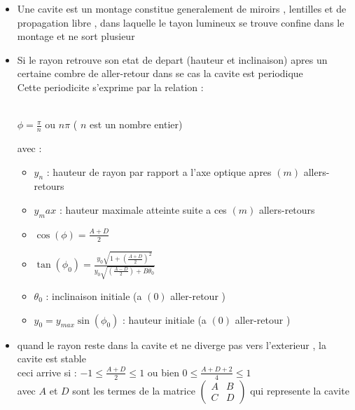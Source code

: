 \documentclass[12pt]{book}
\begin{document}
        \begin{itemize}
            \item Une cavite est un montage constitue generalement de miroirs , lentilles et de propagation libre , dans laquelle le tayon lumineux se trouve confine dans le montage et ne sort plusieur
            \item Si le rayon retrouve son etat de depart (hauteur et inclinaison) apres un certaine combre de aller-retour dans se cas la cavite est periodique \\
                  Cette periodicite s'exprime par la relation :
                  \begin{center}
                     \\
                    $\phi = \frac{\pi}{n}$ ou $n\pi$ ( $n$ est un nombre entier)
                  \end{center}
                  avec : 
                  \begin{itemize}
                    \item $y_n$ : hauteur de rayon par rapport a l'axe optique apres $(m)$ allers-retours
                    \item $y_max$ : hauteur maximale atteinte suite a ces $(m)$ allers-retours 
                    \item $\cos(\phi) = \frac{A+D}{2}$
                    \item $\tan(\phi_0) = \frac{y_0\sqrt{1+(\frac{A+D}{2})^2}}{y_0 \sqrt{(\frac{A-D}{2})+B\theta_0}}$
                    \item $\theta_0 $ : inclinaison initiale (a $(0)$ aller-retour ) 
                    \item $y_0 = y_{max}\sin(\phi_0) $ : hauteur initiale (a $(0)$ aller-retour ) 
                  \end{itemize}
            \item quand le rayon reste dans la cavite et ne diverge pas vers l'exterieur , la cavite est stable
             \\   ceci arrive si : $-1 \leq \frac{A+D}{2}\leq 1 $ ou bien $0 \leq \frac{A+D+2}{4}\leq 1 $ \\
             avec $A$ et $D$ sont les termes de la matrice 
             $\begin{pmatrix}
                A & B\\
                C & D
            \end{pmatrix}$
            qui represente la cavite 
        \end{itemize}
        
\end{document}
